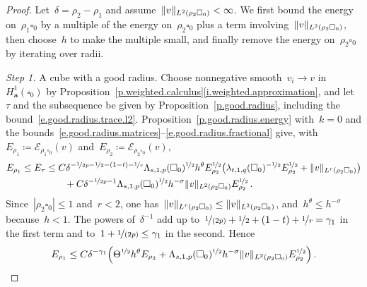 \documentclass[11pt,letterpaper]{article}
\numberwithin{equation}{section}
\theoremstyle{definition}
\renewcommand{\a}{\mathbf{a}}
\newcommand{\nf}{\nicefrac}
\newcommand{\cu}{\square}
\DeclarePairedDelimiter{\norm}{\lVert}{\rVert}
\newcommand{\Ener}{\mathcal E}
\begin{document}
\begin{proof}
Let~$\delta=\rho_2-\rho_1$ and assume~$\norm{v}_{L^2(\rho_2\cu_0)}<\infty$. We first bound the energy on~$\rho_1\cu_0$ by a multiple of the energy on~$\rho_2\cu_0$ plus a term involving~$\norm{v}_{L^2(\rho_2\cu_0)}$, then choose~$h$ to make the multiple small, and finally remove the energy on~$\rho_2\cu_0$ by iterating over radii.

\smallskip

\emph{Step 1.} A cube with a good radius. Choose nonnegative smooth~$v_i\to v$ in~$H^1_\a(\cu_0)$ by Proposition~\ref{p.weighted.calculus}\ref{i.weighted.approximation}, and let~$\tau$ and the subsequence be given by Proposition~\ref{p.good.radius}, including the bound~\eqref{e.good.radius.trace.l2}. Proposition~\ref{p.good.radius.energy} with~$k=0$ and the bounds~\eqref{e.good.radius.matrices}--\eqref{e.good.radius.fractional} give, with~$E_{\rho_1}\coloneqq\Ener_{\rho_1\cu_0}(v)$ and~$E_{\rho_2}\coloneqq\Ener_{\rho_2\cu_0}(v)$,
\begin{align*}
	E_{\rho_1}\leq E_\tau&\leq C\delta^{-\nf1{2p}-\nf12-(1-t)-\nf1r}\Lambda_{s,1,p}(\cu_0)^{\nf12}h^\theta E_{\rho_2}^{\nf12}\bigl(\lambda_{t,1,q}(\cu_0)^{-\nf12}E_{\rho_2}^{\nf12}+\norm{v}_{L^r(\rho_2\cu_0)}\bigr)\notag\\
	&\qquad+C\delta^{-\nf1{2p}-1}\Lambda_{s,1,p}(\cu_0)^{\nf12}h^{-\sigma}\norm{v}_{L^2(\rho_2\cu_0)}E_{\rho_2}^{\nf12}\,.
\end{align*}
Since~$|\rho_2\cu_0|\leq1$ and~$r<2$, one has~$\norm{v}_{L^r(\rho_2\cu_0)}\leq\norm{v}_{L^2(\rho_2\cu_0)}$, and~$h^\theta\leq h^{-\sigma}$ because~$h<1$. The powers of~$\delta^{-1}$ add up to~$\nf1{(2p)}+\nf12+(1-t)+\nf1r=\gamma_1$ in the first term and to~$1+\nf1{(2p)}\leq\gamma_1$ in the second. Hence
\begin{equation}
	E_{\rho_1}\leq C\delta^{-\gamma_1}\Bigl(\Theta^{\nf12}h^\theta E_{\rho_2}+\Lambda_{s,1,p}(\cu_0)^{\nf12}h^{-\sigma}\norm{v}_{L^2(\rho_2\cu_0)}E_{\rho_2}^{\nf12}\Bigr)\,.
	\label{e.inner.energy.bound}
\end{equation}
\smallskip


\end{proof}
\end{document}
